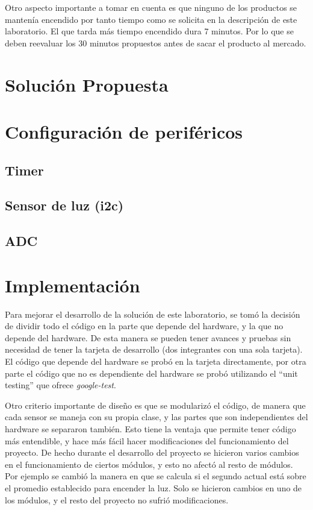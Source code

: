 Otro aspecto importante a tomar en cuenta es que ninguno de los productos se mantenía encendido por
tanto tiempo como se solicita en la descripción de este laboratorio. El que tarda más tiempo
encendido dura 7 minutos. Por lo que se deben reevaluar los 30 minutos propuestos antes de sacar el
producto al mercado.  

\section{Solución Propuesta}

\section{Configuración de periféricos}

\subsection{Timer}

\subsection{Sensor de luz (i2c)}

\subsection{ADC}

\section{Implementación}

Para mejorar el desarrollo de la solución de este laboratorio, se tomó la decisión de dividir todo
el código en la parte que depende del hardware, y la que no depende del hardware. De esta manera se
pueden tener avances y pruebas sin necesidad de tener la tarjeta de desarrollo (dos integrantes con
una sola tarjeta). El código que depende del hardware se probó en la tarjeta directamente, por otra
parte el código que no es dependiente del hardware se probó utilizando el ``unit testing'' que
ofrece \textit{google-test}.

Otro criterio importante de diseño es que se modularizó el código, de manera que cada sensor se
maneja con su propia clase, y las partes que son independientes del hardware se separaron
también. Esto tiene la ventaja que permite tener código más entendible, y hace más fácil hacer
modificaciones del funcionamiento del proyecto. De hecho durante el desarrollo del proyecto se
hicieron varios cambios en el funcionamiento de ciertos módulos, y esto no afectó al resto de
módulos. Por ejemplo se cambió la manera en que se calcula si el segundo actual está sobre el
promedio establecido para encender la luz. Solo se hicieron cambios en uno de los módulos, y el
resto del proyecto no sufrió modificaciones.

